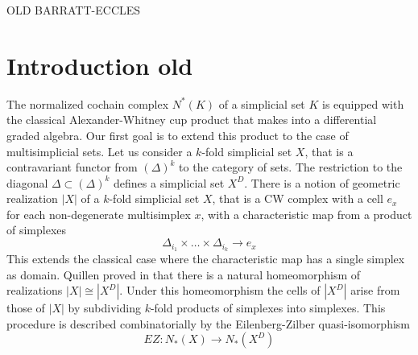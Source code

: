 OLD BARRATT-ECCLES


%
%
%


\section{Introduction old}

The normalized cochain complex $N^*(K)$ of a simplicial set $K$ is equipped with the classical Alexander-Whitney cup product that makes into a differential graded algebra.
Our first goal is to extend this product to the case of multisimplicial sets.
Let us consider a $k$-fold simplicial set $X$, that is a contravariant functor from $(\Delta)^k$ to the category of sets.
The restriction to the diagonal $\Delta \subset (\Delta)^k$ defines a simplicial set $X^D$.
There is a notion of geometric realization $|X|$ of a $k$-fold simplicial set $X$, that is a CW complex with a cell $e_x$ for each non-degenerate multisimplex $x$, with a characteristic map from a product of simplexes $$\Delta_{i_1} \times \dots \times \Delta_{i_k} \to e_x$$ This extends the classical case where the characteristic map has a single simplex as domain.
Quillen proved in \cite{Quillen} that there is a natural homeomorphism of realizations $|X| \cong |X^D|$.
Under this homeomorphism the cells of $|X^D|$ arise from those of $|X|$ by subdividing $k$-fold products of simplexes into simplexes.
This procedure is described combinatorially by the Eilenberg-Zilber quasi-isomorphism
$$EZ:N_*(X) \to N_*(X^D)$$

